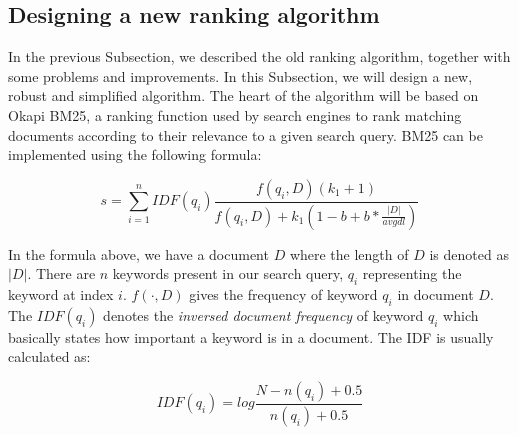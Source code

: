 \subsection{Designing a new ranking algorithm}
In the previous Subsection, we described the old ranking algorithm, together with some problems and improvements. In this Subsection, we will design a new, robust and simplified algorithm. The heart of the algorithm will be based on Okapi BM25, a ranking function used by search engines to rank matching documents according to their relevance to a given search query\cite{jones2000probabilistic}. BM25 can be implemented using the following formula:

\begin{equation}
\label{eq:bm25}
s = \sum_{i=1}^{n} IDF(q_i) \frac{f(q_i, D)(k_1 + 1)}{f(q_i, D) + k_1 (1 - b + b * \frac{|D|}{avgdl})}
\end{equation}

In the formula above, we have a document $ D $ where the length of $ D $ is denoted as $ |D| $. There are $ n $ keywords present in our search query, $ q_i $ representing the keyword at index $ i $. $ f(\cdot, D) $ gives the frequency of keyword $ q_i $ in document $ D $. The $ IDF(q_i) $ denotes the \emph{inversed document frequency} of keyword $ q_i $ which basically states how important a keyword is in a document. The IDF is usually calculated as:

\begin{equation}
\label{eq:bm25-idf}
IDF(q_i) = log\frac{N - n(q_i) + 0.5}{n(q_i) + 0.5}
\end{equation}


